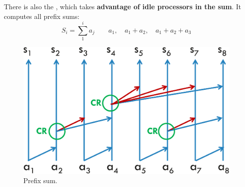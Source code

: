 \noindent
There is also the , which takes \textbf{advantage of idle processors in the sum}. It computes all prefix sums:
\begin{equation*}
    S_{i} = \displaystyle\sum_{1}^{i} a_{j} \hspace{2em} a_{1}, \hspace{1em} a_{1}+a_{2}, \hspace{1em} a_{1}+a_{2}+a_{3}
\end{equation*}
\begin{figure}[!htp]
    \centering
    \includegraphics[width=.7\textwidth]{img/prefix-sum-1.pdf}
    \caption{Prefix sum.}
\end{figure}